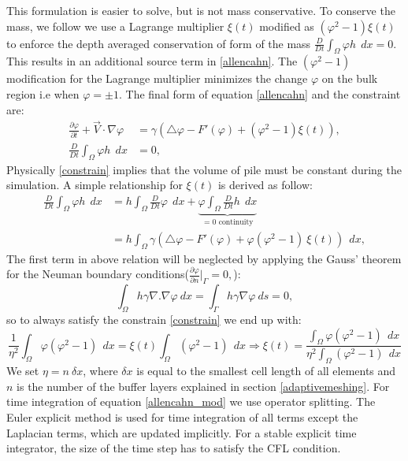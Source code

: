 \documentclass[review]{elsarticle}
\begin{document}
This formulation is easier to solve, but is not mass conservative. To conserve the mass, we follow \cite{Kim2014,Yang2006} we use a Lagrange multiplier $\xi(t)$ modified as $(\varphi^2-1)\xi(t)$ to enforce the depth
averaged conservation of form of the mass $ \frac{D}{Dt} \int_\Omega \varphi h \ \ dx= 0$. This results in an additional source term in  \eqref{allencahn}.
 The $(\varphi^2-1)$ modification  for the Lagrange multiplier minimizes the  change $\varphi$ on the bulk region  i.e when $\varphi=\pm1$. 
 The final form of equation \eqref{allencahn} and the constraint are:  
\begin{align} 
        \label{allencahn_mod}
        \frac{\partial \varphi }{\partial t} + \overrightarrow{V}\cdot \nabla \varphi &= 
        \gamma (\bigtriangleup\varphi -F'(\varphi)+ (\varphi^2-1)\xi(t)), \\
        \label{constrain}
        \frac{D}{Dt} \int_\Omega \varphi h \ \ dx&= 0,
\end{align}
Physically \eqref{constrain} implies that the volume of pile must be constant during the simulation. A simple relationship for  $\xi(t)$ is derived as follow:
\begin{equation} 
    \begin{aligned}
        \label{eta}
        \frac{D}{Dt} \int_\Omega \varphi h \ \ dx &= h \int_\Omega \frac{D}{Dt}  \varphi  \ \ dx+\underbrace{\varphi \int_\Omega  \frac{D}{Dt} h  \ \ dx}_{=0 \text{\ \ continuity}} \\ &=h\int_\Omega \gamma (\bigtriangleup\varphi -F'(\varphi)+\varphi (\varphi^2-1)\ \xi(t)) \ \ dx,
            \end{aligned}
\end{equation}
The first term in above relation will be neglected by applying the Gauss' theorem for the Neuman boundary conditions($
        \frac{\partial \varphi}{\partial n}\vert_{\Gamma} = 0,
$):
\begin{equation}
        \label{lapbound}
        \int_\Omega h \gamma  \nabla. \nabla \varphi \ dx = 
        \int_\Gamma h \gamma \nabla \varphi \ ds = 0,
\end{equation}
so to always satisfy the constrain \eqref{constrain} we end up with:
\begin{equation} 
        \label{eta_cont}
\frac{1}{\eta^2} \int_\Omega  \varphi (\varphi^2 -1) \ \ dx = \xi(t) \int_\Omega (\varphi^2-1)  \ \ dx \Rightarrow \xi(t) = \frac{\int_\Omega  \varphi (\varphi^2 -1) \ \ dx}{\eta^2 \int_\Omega (\varphi^2-1)  \ \ dx }
\end{equation}
We set $\eta=n\  \delta x$, where $\delta x$ is equal to the smallest cell length of all elements and $n$ is the number of the buffer layers explained in section \ref{adaptivemeshing}.
For time integration of equation \eqref{allencahn_mod} we use operator splitting. The Euler explicit method is used for time integration of all terms except the Laplacian terms, 
which are updated implicitly. For a stable explicit time integrator, the size of the time step has to satisfy the CFL condition.
\end{document}
